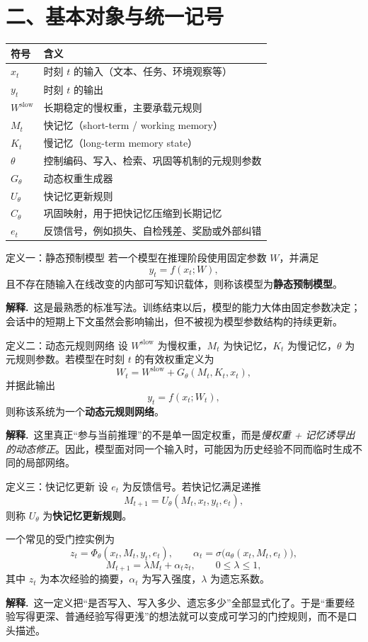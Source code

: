 \documentclass[11pt]{article}
\newcommand{\Explain}{\par\smallskip\noindent\textbf{解释.}\ }
\begin{document}
\section*{二、基本对象与统一记号}

\begin{center}
\renewcommand{\arraystretch}{1.3}
\begin{tabular}{>{\raggedright\arraybackslash}p{} p{}}
\toprule
符号 & 含义 \\
\midrule
$x_t$ & 时刻 $t$ 的输入（文本、任务、环境观察等） \\
$y_t$ & 时刻 $t$ 的输出 \\
$W^{\mathrm{slow}}$ & 长期稳定的慢权重，主要承载元规则 \\
$M_t$ & 快记忆（short-term / working memory） \\
$K_t$ & 慢记忆（long-term memory state） \\
$\theta$ & 控制编码、写入、检索、巩固等机制的元规则参数 \\
$G_\theta$ & 动态权重生成器 \\
$U_\theta$ & 快记忆更新规则 \\
$C_\theta$ & 巩固映射，用于把快记忆压缩到长期记忆 \\
$e_t$ & 反馈信号，例如损失、自检残差、奖励或外部纠错 \\
\bottomrule
\end{tabular}
\end{center}

\begin{defbox}{定义一：静态预制模型}
若一个模型在推理阶段使用固定参数 $W$，并满足
\[
 y_t = f(x_t;W),
\]
且不存在随输入在线改变的内部可写知识载体，则称该模型为\textbf{静态预制模型}。
\end{defbox}
\Explain 这是最熟悉的标准写法。训练结束以后，模型的能力大体由固定参数决定；会话中的短期上下文虽然会影响输出，但不被视为模型参数结构的持续更新。

\begin{defbox}{定义二：动态元规则网络}
设 $W^{\mathrm{slow}}$ 为慢权重，$M_t$ 为快记忆，$K_t$ 为慢记忆，$\theta$ 为元规则参数。若模型在时刻 $t$ 的有效权重定义为
\[
 W_t = W^{\mathrm{slow}} + G_\theta(M_t,K_t,x_t),
\]
并据此输出
\[
 y_t = f(x_t;W_t),
\]
则称该系统为一个\textbf{动态元规则网络}。
\end{defbox}
\Explain 这里真正“参与当前推理”的不是单一固定权重，而是\emph{慢权重 + 记忆诱导出的动态修正}。因此，模型面对同一个输入时，可能因为历史经验不同而临时生成不同的局部网络。

\begin{defbox}{定义三：快记忆更新}
设 $e_t$ 为反馈信号。若快记忆满足递推
\[
 M_{t+1}=U_\theta(M_t,x_t,y_t,e_t),
\]
则称 $U_\theta$ 为\textbf{快记忆更新规则}。

一个常见的受门控实例为
\[
 z_t = \Phi_\theta(x_t,M_t,y_t,e_t), \qquad
 \alpha_t = \sigma\!\bigl(a_\theta(x_t,M_t,e_t)\bigr),
\]
\[
 M_{t+1}=\lambda M_t + \alpha_t z_t,
\qquad 0\le \lambda \le 1,
\]
其中 $z_t$ 为本次经验的摘要，$\alpha_t$ 为写入强度，$\lambda$ 为遗忘系数。
\end{defbox}
\Explain 这一定义把“是否写入、写入多少、遗忘多少”全部显式化了。于是“重要经验写得更深、普通经验写得更浅”的想法就可以变成可学习的门控规则，而不是口头描述。
\end{document}
